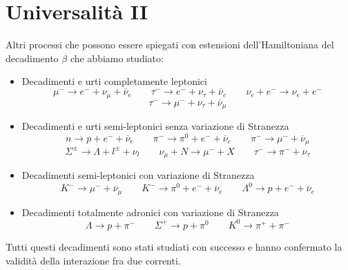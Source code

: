 \section{Universalità II}
Altri processi che possono essere spiegati con estensioni dell'Hamiltoniana del decadimento $\beta$ che abbiamo studiato:
\begin{itemize}
	\item Decadimenti e urti completamente leptonici
	$$
	\mu^- \to e^- + \nu_\mu + \overline{\nu}_e \quad \quad \tau^- \to e^- + \nu_\tau + \overline{\nu}_e \quad \quad \nu_e + e^- \to \nu_e + e^-
	$$
	$$
	\tau^- \to \mu^- + \nu_\tau + \overline{\nu}_\mu
	$$
	\item Decadimenti e urti semi-leptonici senza variazione di Stranezza
	$$
	n \to p + e^- + \overline{\nu}_e \quad \quad \pi^- \to \pi^0 + e^- + \overline{\nu}_e \quad \quad \pi^- \to \mu^- + \overline{\nu}_\mu
	$$
	$$
	\Sigma^\pm \to \Lambda + l^\pm + \nu_l \quad \quad \nu_\mu + N \to \mu^- + X \quad \quad \tau^- \to \pi^- + \nu_\tau
	$$
	\item Decadimenti semi-leptonici con variazione di Stranezza
	$$
	K^- \to \mu^- + \overline{\nu}_\mu \quad \quad K^- \to \pi^0 + e^- + \overline{\nu}_e \quad \quad \Lambda^0 \to p + e^- + \overline{\nu}_e
	$$
	\item Decadimenti totalmente adronici con variazione di Stranezza
	$$
	\Lambda \to p + \pi^- \quad \quad \Sigma^+ \to p + \pi^0 \quad \quad K^0 \to \pi^+ + \pi^-
	$$
\end{itemize}
Tutti questi decadimenti sono stati studiati con successo e hanno confermato la validità della interazione fra due correnti.
